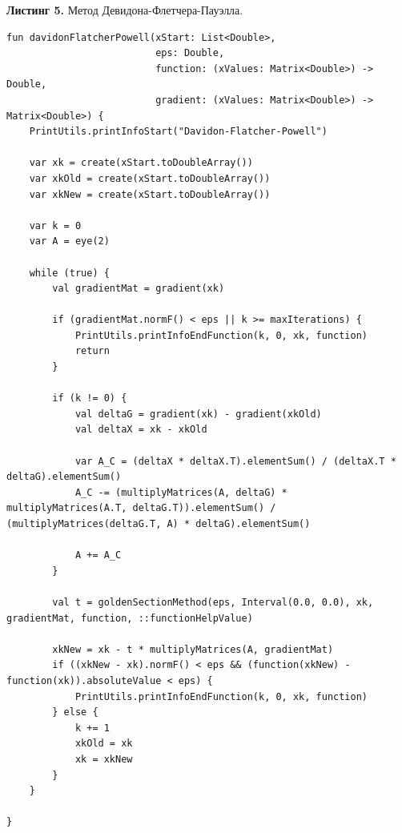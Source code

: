 \documentclass[a4paper, 12pt]{article}   	%
\begin{document}
\textbf{Листинг 5.} Метод Девидона-Флетчера-Пауэлла.
    \begin{verbatim}
fun davidonFlatcherPowell(xStart: List<Double>,
                          eps: Double,
                          function: (xValues: Matrix<Double>) -> Double,
                          gradient: (xValues: Matrix<Double>) -> Matrix<Double>) {
    PrintUtils.printInfoStart("Davidon-Flatcher-Powell")

    var xk = create(xStart.toDoubleArray())
    var xkOld = create(xStart.toDoubleArray())
    var xkNew = create(xStart.toDoubleArray())

    var k = 0
    var A = eye(2)

    while (true) {
        val gradientMat = gradient(xk)

        if (gradientMat.normF() < eps || k >= maxIterations) {
            PrintUtils.printInfoEndFunction(k, 0, xk, function)
            return
        }

        if (k != 0) {
            val deltaG = gradient(xk) - gradient(xkOld)
            val deltaX = xk - xkOld

            var A_C = (deltaX * deltaX.T).elementSum() / (deltaX.T * deltaG).elementSum()
            A_C -= (multiplyMatrices(A, deltaG) * multiplyMatrices(A.T, deltaG.T)).elementSum() / (multiplyMatrices(deltaG.T, A) * deltaG).elementSum()

            A += A_C
        }

        val t = goldenSectionMethod(eps, Interval(0.0, 0.0), xk, gradientMat, function, ::functionHelpValue)

        xkNew = xk - t * multiplyMatrices(A, gradientMat)
        if ((xkNew - xk).normF() < eps && (function(xkNew) - function(xk)).absoluteValue < eps) {
            PrintUtils.printInfoEndFunction(k, 0, xk, function)
        } else {
            k += 1
            xkOld = xk
            xk = xkNew
        }
    }

}
\end{verbatim}
\end{document}

